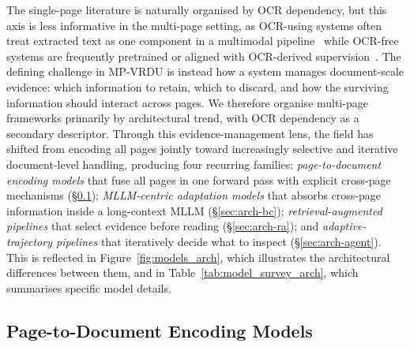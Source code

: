 \documentclass[11pt]{article}
\begin{document}
The single-page literature is naturally organised by OCR dependency, but this axis is less informative in the multi-page setting, as OCR-using systems often treat extracted text as one component in a multimodal pipeline~\cite{sun2025docagent,wang2025vidorag} while OCR-free systems are frequently pretrained or aligned with OCR-derived supervision~\cite{tanaka2025vdocrag,hu2024mplugdocowl}. The defining challenge in MP-VRDU is instead how a system manages document-scale evidence: which information to retain, which to discard, and how the surviving information should interact across pages. We therefore organise multi-page frameworks primarily by architectural trend, with OCR dependency as a secondary descriptor. Through this evidence-management lens, the field has shifted from encoding all pages jointly toward increasingly selective and iterative document-level handling, producing four recurring families: \emph{page-to-document encoding models} that fuse all pages in one forward pass with explicit cross-page mechanisms (\S\ref{sec:arch-p2d}); \emph{MLLM-centric adaptation models} that absorbs cross-page information inside a long-context MLLM (\S\ref{sec:arch-bc}); \emph{retrieval-augmented pipelines} that select evidence before reading (\S\ref{sec:arch-ra}); and \emph{adaptive-trajectory pipelines} that iteratively decide what to inspect (\S\ref{sec:arch-agent}). This is reflected in Figure~\ref{fig:models_arch}, which illustrates the architectural differences between them, and in Table~\ref{tab:model_survey_arch}, which summarises specific model details. 



\subsection{Page-to-Document Encoding Models} 
\label{sec:arch-p2d}
\end{document}
